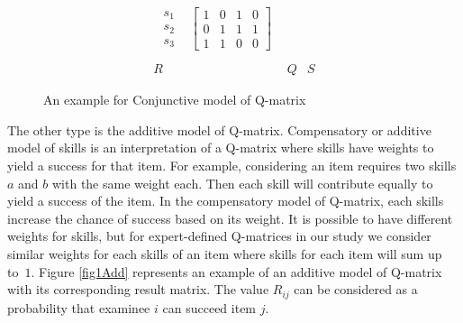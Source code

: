 \begin{figure}
\begin{footnotesize}
\[\begin{array}{ccc}
\begin{array}{cc}
\begin{array}{c}
s_{1}\\
s_{2}\\
s_{3}
\end{array} & \left[\begin{array}{cccc}
1 & 0 & 1 & 0\\
0 & 1 & 1 & 1\\
1 & 1 & 0 & 0
\end{array}\right]
\end{array}\\
\\
R & Q & S
\end{array}
\]
 \end{footnotesize} \caption{An example for Conjunctive model of Q-matrix}


\label{fig1} 
\end{figure}


The other type is the additive model of Q-matrix. Compensatory or additive model of skills is an interpretation of a Q-matrix where skills have weights to yield a success for that item. For example, considering an item requires two skills $a$ and $b$ with the same weight each. Then each skill will contribute equally to yield a success of the item. In the compensatory model of Q-matrix, each skills increase the chance of success based on its weight. It is possible to have different weights for skills, but for expert-defined Q-matrices in our study we consider similar weights for each skills of an item where skills for each item will sum up to~$1$. Figure \ref{fig1Add} represents an example of an additive model of Q-matrix with its corresponding result matrix. The value $R_{ij}$  can be considered as a probability that examinee $i$ can succeed item $j$.

